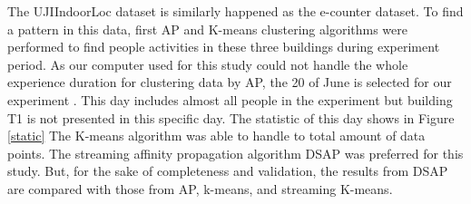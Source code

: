 








The UJIIndoorLoc dataset is similarly happened as the e-counter dataset. To find a pattern in this data, first AP and K-means clustering algorithms were performed to find people activities in these three buildings during experiment period. As our computer used for this study could not handle the whole experience duration for clustering data by AP, the 20 of June is selected for our experiment . This day includes almost all people in the experiment but building T1 is not presented in this specific day. The statistic of this day shows in Figure \ref{static} The K-means algorithm was able to handle to total amount of data points.
The streaming affinity propagation algorithm  DSAP was preferred for this study. But, for the sake of completeness and validation, the results from DSAP are compared with those from AP, k-means, and streaming K-means.


